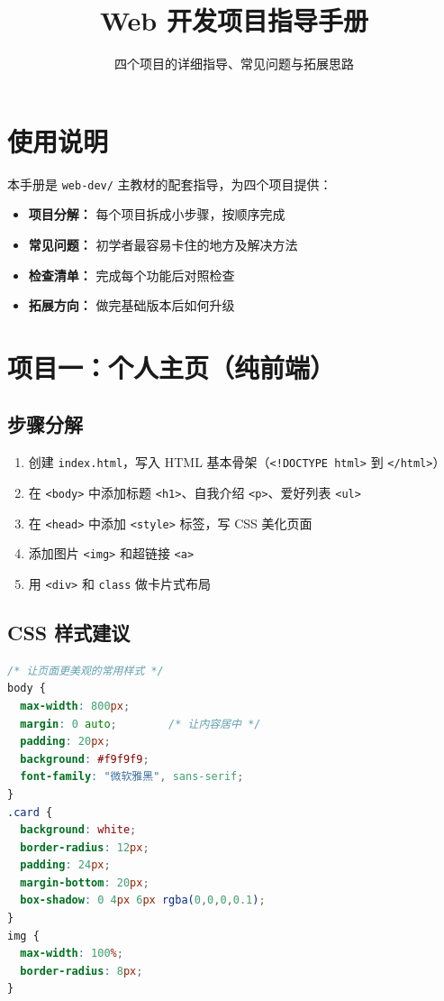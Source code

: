 \documentclass[a4paper,12pt]{ctexart}
\title{\textcolor{blue!70!black}{\Huge\textbf{Web 开发项目指导手册}}}
\author{四个项目的详细指导、常见问题与拓展思路}
\date{}
\begin{document}
\maketitle
\thispagestyle{empty}

\section*{使用说明}

本手册是 \texttt{web-dev/} 主教材的配套指导，为四个项目提供：
\begin{itemize}
  \item \textbf{项目分解：} 每个项目拆成小步骤，按顺序完成
  \item \textbf{常见问题：} 初学者最容易卡住的地方及解决方法
  \item \textbf{检查清单：} 完成每个功能后对照检查
  \item \textbf{拓展方向：} 做完基础版本后如何升级
\end{itemize}

\section*{项目一：个人主页（纯前端）}

\subsection*{步骤分解}

\begin{enumerate}
  \item 创建 \texttt{index.html}，写入 HTML 基本骨架（\texttt{<!DOCTYPE html>} 到 \texttt{</html>}）
  \item 在 \texttt{<body>} 中添加标题 \texttt{<h1>}、自我介绍 \texttt{<p>}、爱好列表 \texttt{<ul>}
  \item 在 \texttt{<head>} 中添加 \texttt{<style>} 标签，写 CSS 美化页面
  \item 添加图片 \texttt{<img>} 和超链接 \texttt{<a>}
  \item 用 \texttt{<div>} 和 \texttt{class} 做卡片式布局
\end{enumerate}

\subsection*{CSS 样式建议}

\begin{lstlisting}[language=CSS]
/* 让页面更美观的常用样式 */
body {
  max-width: 800px;
  margin: 0 auto;        /* 让内容居中 */
  padding: 20px;
  background: #f9f9f9;
  font-family: "微软雅黑", sans-serif;
}
.card {
  background: white;
  border-radius: 12px;
  padding: 24px;
  margin-bottom: 20px;
  box-shadow: 0 4px 6px rgba(0,0,0,0.1);
}
img {
  max-width: 100%;
  border-radius: 8px;
}
\end{lstlisting}
\end{document}
